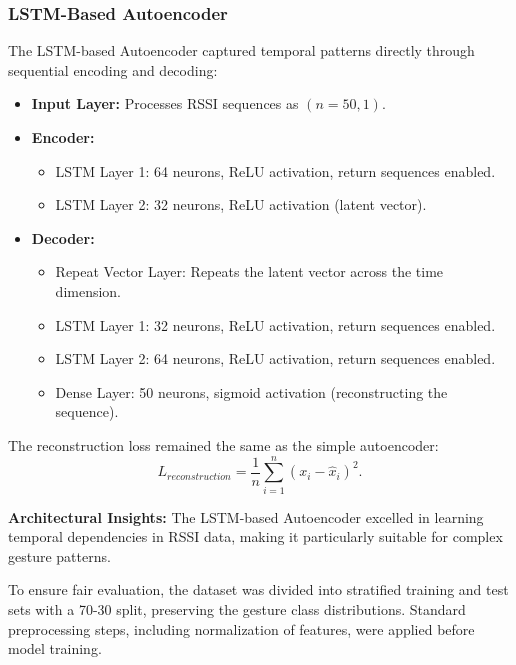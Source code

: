 \documentclass[10pt,twocolumn,letterpaper]{article}
\begin{document}
\subsubsection{LSTM-Based Autoencoder}
The LSTM-based Autoencoder captured temporal patterns directly through sequential encoding and decoding:
\begin{itemize}
    \item \textbf{Input Layer:} Processes RSSI sequences as \((n=50, 1)\).
    \item \textbf{Encoder:}
        \begin{itemize}
            \item LSTM Layer 1: 64 neurons, ReLU activation, return sequences enabled.
            \item LSTM Layer 2: 32 neurons, ReLU activation (latent vector).
        \end{itemize}
    \item \textbf{Decoder:}
        \begin{itemize}
            \item Repeat Vector Layer: Repeats the latent vector across the time dimension.
            \item LSTM Layer 1: 32 neurons, ReLU activation, return sequences enabled.
            \item LSTM Layer 2: 64 neurons, ReLU activation, return sequences enabled.
            \item Dense Layer: 50 neurons, sigmoid activation (reconstructing the sequence).
        \end{itemize}
\end{itemize}

The reconstruction loss remained the same as the simple autoencoder:
\begin{equation}
    L_{reconstruction} = \frac{1}{n} \sum_{i=1}^n \left(x_i - \hat{x}_i\right)^2.
\end{equation}

\textbf{Architectural Insights:} The LSTM-based Autoencoder excelled in learning temporal dependencies in RSSI data, making it particularly suitable for complex gesture patterns.


To ensure fair evaluation, the dataset was divided into stratified training and test sets with a 70-30 split, preserving the gesture class distributions. Standard preprocessing steps, including normalization of features, were applied before model training.
\end{document}
